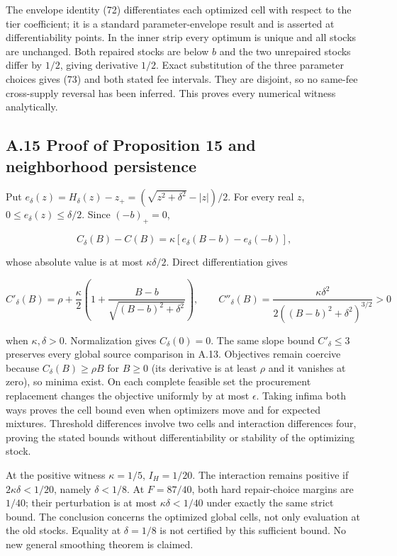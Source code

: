 \documentclass[
  11pt,
  a4paper,
]{article}
\begin{document}
The envelope identity (72) differentiates each optimized cell with
respect to the tier coefficient; it is a standard parameter-envelope
result and is asserted at differentiability points. In the inner strip
every optimum is unique and all stocks are unchanged. Both repaired
stocks are below \(b\) and the two unrepaired stocks differ by \(1/2\),
giving derivative \(1/2\). Exact substitution of the three parameter
choices gives (73) and both stated fee intervals. They are disjoint, so
no same-fee cross-supply reversal has been inferred. This proves every
numerical witness analytically.

\hypertarget{a.15-proof-of-proposition-15-and-neighborhood-persistence}{%
\subsection{A.15 Proof of Proposition 15 and neighborhood
persistence}\label{a.15-proof-of-proposition-15-and-neighborhood-persistence}}

Put \(e_\delta(z)=H_\delta(z)-z_+=(\sqrt{z^2+\delta^2}-|z|)/2\). For
every real \(z\), \(0\leq e_\delta(z)\leq\delta/2\). Since \((-b)_+=0\),

\[C_\delta(B)-C(B)=\kappa[e_\delta(B-b)-e_\delta(-b)],\tag{77}\]

whose absolute value is at most \(\kappa\delta/2\). Direct
differentiation gives

\[C'_\delta(B)=\rho+\frac{\kappa}{2}\left(1+\frac{B-b}{\sqrt{(B-b)^2+\delta^2}}\right),\qquad
C''_\delta(B)=\frac{\kappa\delta^2}{2((B-b)^2+\delta^2)^{3/2}}>0\tag{78}\]

when \(\kappa,\delta>0\). Normalization gives \(C_\delta(0)=0\). The
same slope bound \(C'_\delta\leq3\) preserves every global source
comparison in A.13. Objectives remain coercive because
\(C_\delta(B)\geq\rho B\) for \(B\geq0\) (its derivative is at least
\(\rho\) and it vanishes at zero), so minima exist. On each complete
feasible set the procurement replacement changes the objective uniformly
by at most \(\epsilon\). Taking infima both ways proves the cell bound
even when optimizers move and for expected mixtures. Threshold
differences involve two cells and interaction differences four, proving
the stated bounds without differentiability or stability of the
optimizing stock.

At the positive witness \(\kappa=1/5\), \(I_H=1/20\). The interaction
remains positive if \(2\kappa\delta<1/20\), namely \(\delta<1/8\). At
\(F=87/40\), both hard repair-choice margins are \(1/40\); their
perturbation is at most \(\kappa\delta<1/40\) under exactly the same
strict bound. The conclusion concerns the optimized global cells, not
only evaluation at the old stocks. Equality at \(\delta=1/8\) is not
certified by this sufficient bound. No new general smoothing theorem is
claimed.
\end{document}
